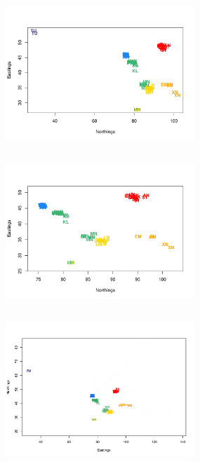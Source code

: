 \documentclass[12pt]{article}
\newcommand{\gb}[1]{{\em \color{magenta} #1}}
\begin{document}
\begin{figure}
	\centering
			{\includegraphics[width=2.8in,height=2.3in]{figs/warblers/warb_ind_noad.pdf}}
			{\includegraphics[width=2.8in,height=2.3in]{figs/warblers/warb_ind_noad_closeup.pdf}}
			{\includegraphics[width=2.8in,height=2.3in]{figs/warblers/individual_warbler_map_arrows_randpr1.png}}

\end{figure}
\end{document}
